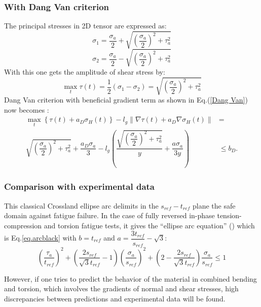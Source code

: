 \subsubsection{With Dang Van criterion}
The principal stresses in 2D tensor are expressed as:
$$\sigma_1=\dfrac{\sigma_a}{2}+\sqrt{\left( \dfrac{\sigma_a}{2}\right)^2+\tau_a^2 }$$
$$\sigma_2=\dfrac{\sigma_a}{2}-\sqrt{\left( \dfrac{\sigma_a}{2}\right)^2+\tau_a^2 }$$
With this one gets the amplitude of shear stress by:
$$\max\limits_{t}\tau(t)=\dfrac{1}{2}(\sigma_1-\sigma_2)=\sqrt{\left( \dfrac{\sigma_a}{2}\right)^2+\tau_a^2 }$$
Dang Van criterion with beneficial gradient term as shown in Eq.(\ref{Dang Van}) now becomes :
\begin{equation}
	\begin{split}
		\max\limits_{t}\left\{\tau{(t)}+a_D\sigma_H(t)\right\}-l_g\parallel{\nabla\tau{(t)}}+a_D\nabla\sigma_H(t)\parallel&=
		\\\sqrt{\left(\dfrac{\sigma_a}{2}\right)^2+\tau_a^2}+\dfrac{a_D\sigma_a}{3}-l_g\left( \dfrac{\sqrt{\left(\dfrac{\sigma_a}{2}\right)^2+\tau_a^2}}{y}+\dfrac{a\sigma_a}{3y}\right) &\leqslant b_D.
	\end{split}
	\label{Dang Van}
\end{equation}

\subsubsection{Comparison with experimental data}
This classical Crossland ellipse arc delimits in the $s_{ref}-t_{ref}$  plane the safe domain against fatigue failure. In the case of fully reversed in-phase tension-compression and torsion fatigue tests, it gives the ``ellipse arc equation'' (\cite{Papadopoulos1996513}) which is Eq.\eqref{eq.arcblack} with $b=t_{ref}$ and $a=\dfrac{3t_{ref}}{s_{ref}}-\sqrt{3}$:
\begin{equation}
	\left( \dfrac{\tau_a}{t_{ref}}\right) ^2+\left( \dfrac{2s_{ref}}{\sqrt{3}t_{ref}}-1\right) \left( \dfrac{\sigma_a}{s_{ref}}\right) ^2+\left( 2-\dfrac{2s_{ref}}{\sqrt{3}t_{ref}}\right) \dfrac{\sigma_a}{s_{ref}}\leqslant 1
	\label{crossland}
\end{equation}

However, if one tries to predict the behavior of the material in combined bending and torsion, which involves  the gradients of normal and shear stresses, high discrepancies between predictions and experimental data will be found. 

